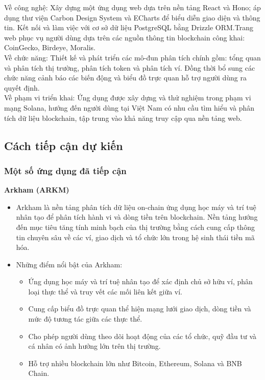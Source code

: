 \documentclass{article}[14pt]
\begin{document}
{    \hspace{0.3cm}Về công nghệ: Xây dựng một ứng dụng web dựa trên nền tảng React và Hono; áp dụng thư viện Carbon Design System và ECharts để biểu diễn giao diện và thông tin. Kết nối và làm việc với cơ sở dữ liệu PostgreSQL bằng Drizzle ORM.Trang web phục vụ người dùng dựa trên các nguồn thông tin blockchain công khai: CoinGecko, Birdeye, Moralis.\\

    Về chức năng: Thiết kế và phát triển các mô-đun phân tích chính gồm: tổng quan và phân tích thị trường, phân tích token và phân tích ví. Đồng thời bổ sung các chức năng cảnh báo các biến động và biểu đồ trực quan hỗ trợ người dùng ra quyết định.\\

    Về phạm vi triển khai: Ứng dụng được xây dựng và thử nghiệm trong phạm vi mạng Solana, hướng đến người dùng tại Việt Nam có nhu cầu tìm hiểu và phân tích dữ liệu blockchain, tập trung vào khả năng truy cập qua nền tảng web.\\

    \subsection{Cách tiếp cận dự kiến}
    
    \subsubsection{Một số ứng dụng đã tiếp cận}

    \textbf{Arkham (ARKM)} \cite{arkham}
    \begin{itemize}
        \item Arkham là nền tảng phân tích dữ liệu on-chain ứng dụng học máy và trí tuệ nhân tạo để phân tích hành vi và dòng tiền trên blockchain. Nền tảng hướng đến mục tiêu tăng tính minh bạch của thị trường bằng cách cung cấp thông tin chuyên sâu về các ví, giao dịch và tổ chức lớn trong hệ sinh thái tiền mã hóa.

        \item Những điểm nổi bật của Arkham:
        \begin{itemize}
            \item Ứng dụng học máy và trí tuệ nhân tạo để xác định chủ sở hữu ví, phân loại thực thể và truy vết các mối liên kết giữa ví.
            \item Cung cấp biểu đồ trực quan thể hiện mạng lưới giao dịch, dòng tiền và mức độ tương tác giữa các thực thể.
            \item Cho phép người dùng theo dõi hoạt động của các tổ chức, quỹ đầu tư và cá nhân có ảnh hưởng lớn trên thị trường.
            \item Hỗ trợ nhiều blockchain lớn như Bitcoin, Ethereum, Solana và BNB Chain.
        \end{itemize}
    \end{itemize}

}
\end{document}
